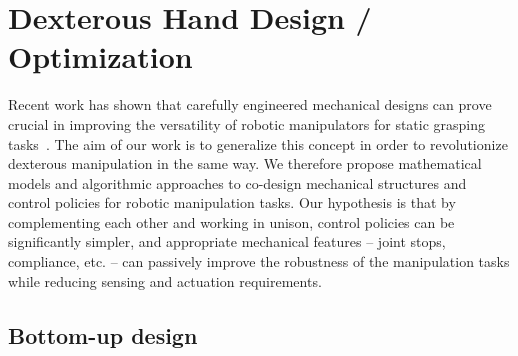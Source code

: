 \section{Dexterous Hand Design / Optimization}
  \label{secHandDesign}

\newcommand{\bA}{\mathbf{A}}
\newcommand{\bB}{\mathbf{B}}
\newcommand{\bC}{\mathbf{C}}
\newcommand{\bD}{\mathbf{D}}
\newcommand{\bE}{\mathbf{E}}
\newcommand{\bF}{\mathbf{F}}
\newcommand{\bG}{\mathbf{G}}
\newcommand{\bH}{\mathbf{H}}
\newcommand{\bI}{\mathbf{I}}
\newcommand{\bJ}{\mathbf{J}}
\newcommand{\bK}{\mathbf{K}}
\newcommand{\bM}{\mathbf{M}}
\newcommand{\bR}{\mathbf{R}}
\newcommand{\bU}{\mathbf{U}}
\newcommand{\ba}{\mathbf{a}}
\newcommand{\bb}{\mathbf{b}}
\newcommand{\bc}{\mathbf{c}}
\newcommand{\bd}{\mathbf{d}}
\newcommand{\be}{\mathbf{e}}
\newcommand{\bff}{\mathbf{f}}
\newcommand{\bg}{\mathbf{g}}
\newcommand{\bk}{\mathbf{k}}
\newcommand{\bm}{\mathbf{m}}
\newcommand{\bn}{\mathbf{n}}
\newcommand{\bp}{\mathbf{p}}
\newcommand{\bs}{\mathbf{s}}
\newcommand{\bt}{\mathbf{t}}
\newcommand{\bu}{\mathbf{u}}
\newcommand{\bv}{\mathbf{v}}
\newcommand{\bx}{\mathbf{x}}
\newcommand{\bl}{\mathbf{l}}
\newcommand{\bq}{\mathbf{q}}
\newcommand{\bw}{\vec{w}}
\newcommand{\bX}{\mathbf{X}}
\newcommand{\bS}{\mathbf{S}}
\newcommand{\bj}{\mathbf{j}}
\newcommand{\bT}{\mathbf{T}}
\newcommand{\bP}{\mathbf{P}}

\newcommand{\bbx}{\bar{\bx}}


Recent work has shown that carefully engineered mechanical designs can prove crucial in improving the versatility of robotic manipulators for static grasping tasks~\cite{Ciocarlie:2014:VGV:2674203.2674213}. The aim of our work is to generalize this concept in order to revolutionize dexterous manipulation in the same way. We therefore propose mathematical models and algorithmic approaches to co-design mechanical structures and control policies for robotic manipulation tasks. Our hypothesis is that by complementing each other and working in unison, control policies can be significantly simpler, and appropriate mechanical features -- joint stops, compliance, etc. -- can passively improve the robustness of the manipulation tasks while reducing sensing and actuation requirements. 

\subsection{Bottom-up design}

